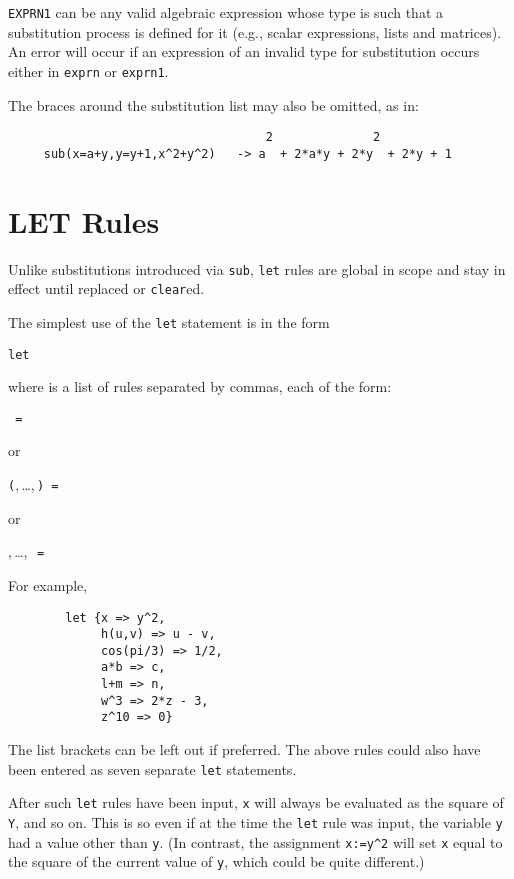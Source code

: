\texttt{EXPRN1} can be any valid algebraic expression whose type is such that
a substitution process is defined for it (e.g., scalar expressions, lists
and matrices).  An error will occur if an expression of an invalid type
for substitution occurs either in \texttt{exprn} or \texttt{exprn1}.

The braces around the substitution list may also be omitted, as in:
\begin{verbatim}
                                    2              2
     sub(x=a+y,y=y+1,x^2+y^2)   -> a  + 2*a*y + 2*y  + 2*y + 1
\end{verbatim}

\section{LET Rules}
\hypertarget{command:LET}{}
\hypertarget{reserved:impliesop}{}
Unlike substitutions introduced via \texttt{sub}, \texttt{let}
rules are global in scope and stay in effect until replaced or \texttt{clear}ed.

The simplest use of the \texttt{let} statement is in the form
\begin{syntax}
  \texttt{let }
\end{syntax}
where  is a list of rules separated by commas, each
of the form:
\begin{syntax}
  \texttt{ = }
\end{syntax}
or
\begin{syntax}
  \texttt{(},\,\dots,\,\texttt{)
    = }
\end{syntax}
or
\begin{syntax}
  ,\,\dots,\,\texttt{
    = }
\end{syntax}
For example,
\begin{verbatim}
        let {x => y^2,
             h(u,v) => u - v,
             cos(pi/3) => 1/2,
             a*b => c,
             l+m => n,
             w^3 => 2*z - 3,
             z^10 => 0}
\end{verbatim}
The list brackets can be left out if preferred.  The above rules could
also have been entered as seven separate \texttt{let} statements.

After such \texttt{let} rules have been input, \texttt{x} will always be
evaluated as the square of \texttt{Y}, and so on.  This is so even if at the
time the \texttt{let} rule was input, the variable \texttt{y} had a value other
than \texttt{y}. (In contrast, the assignment \texttt{x:=y\textasciicircum2} 
will set \texttt{x}
equal to the square of the current value of \texttt{y}, which could be quite
different.)

